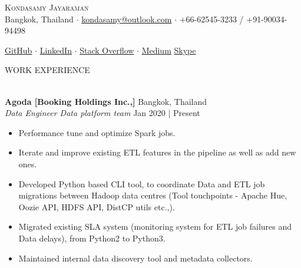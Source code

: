 \documentclass[a4paper]{article}
\newcommand{\lineunder} {
    \vspace*{-8pt} \\
    \hspace*{-18pt} \hrulefill \\
}
\newcommand{\header} [1] {
    {\hspace*{-18pt}\vspace*{6pt} \textsc{#1}}
    \vspace*{-6pt} \lineunder
}
\begin{document}
\vspace*{-50pt}

    

\vspace*{-12pt}
\begin{center}
	{\Huge \scshape {Kondasamy Jayaraman}}\\
	\vspace{1mm}
	\faMapMarker \hspace{.5mm} Bangkok, Thailand $\cdot$ 
	\faEnvelope \hspace{.5mm} \href{mailto:kondasamy@outlook.com}{kondasamy@outlook.com} $\cdot$ \faMobile \hspace{.5mm} +66-62545-3233 / \faWhatsapp  \hspace{.5mm} +91-90034-94498
		
	\faGithub \hspace{.5mm} \href{https://github.com/Kondasamy}{GitHub} $\cdot$
	\faLinkedin \hspace{.5mm} \href{https://www.linkedin.com/in/kondasamy/}{LinkedIn} $\cdot$
	\faStackOverflow \hspace{.5mm} \href{https://stackoverflow.com/users/2094099/kondasamy-jayaraman}{Stack Overflow} $\cdot$
	\faMedium \hspace{.5mm} \href{https://medium.com/@kondasamy}{Medium}
	\faSkype \hspace{.5mm} \href{https://join.skype.com/invite/n0IMYwGkGwQ1}{Skype}\\
\end{center}

\header{WORK EXPERIENCE}
\vspace{1mm}

\textbf{Agoda [Booking Holdings Inc.,]} \hfill Bangkok, Thailand\\
\textit{Data Engineer \textbar{} Data platform team} \hfill Jan 2020 | Present\\
\vspace{-1.5mm}
\begin{itemize} \setlength\itemsep{-0.3em}
    \item Performance tune and optimize Spark jobs.
    \item Iterate and improve existing ETL features in the pipeline as well as add new ones.
    \item Developed Python based CLI tool, to coordinate Data and ETL job migrations between Hadoop data centres (Tool touchpoints - Apache Hue, Oozie API, HDFS API, DistCP utils etc.,).
	\item Migrated existing SLA system (monitoring system for ETL job failures and Data delays), from Python2 to Python3.
	\item Maintained internal data discovery tool and metadata collectors.
\end{itemize}
\end{document}

